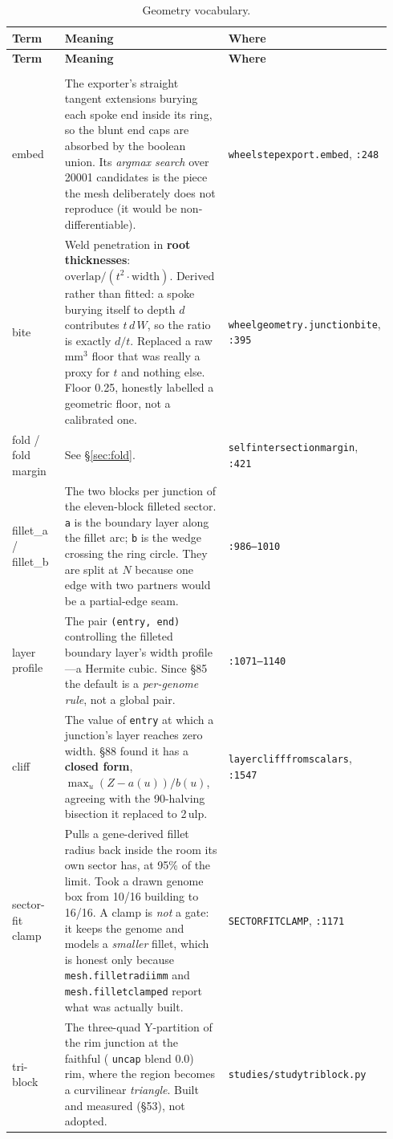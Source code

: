 \documentclass[11pt,a4paper]{article}
\makeatletter
\DeclareRobustCommand{\code}[1]{%
  \texttt{\small\def\_{\textunderscore\discretionary{}{}{}}#1}}
\newenvironment{termtable}[1]
  {\small\begin{longtable}{@{}>{\raggedright\arraybackslash}p{0.19\linewidth}
                             >{\raggedright\arraybackslash}p{0.54\linewidth}
                             >{\raggedright\arraybackslash}p{0.21\linewidth}@{}}
   \caption{#1}\\
   \toprule
   \textbf{Term} & \textbf{Meaning} & \textbf{Where} \\
   \midrule
   \endfirsthead
   \toprule
   \textbf{Term} & \textbf{Meaning} & \textbf{Where} \\
   \midrule
   \endhead
   \midrule
   \multicolumn{3}{r@{}}{\emph{continued on the next page}}\\
   \endfoot
   \bottomrule
   \endlastfoot}
  {\end{longtable}}
\makeatother
\begin{document}
\begin{termtable}{Geometry vocabulary.}
\addlinespace
embed &
  The exporter's straight tangent extensions burying each spoke end inside its ring, so
  the blunt end caps are absorbed by the boolean union. Its \emph{argmax search} over
  20001 candidates is the piece the mesh deliberately does not reproduce (it would be
  non-differentiable). &
  \code{wheel\_step\_export.\_embed}, \code{:248} \\
\addlinespace
bite &
  Weld penetration in \textbf{root thicknesses}:
  $\mathrm{overlap}/(t^2 \cdot \mathrm{width})$. Derived rather than fitted: a spoke
  burying itself to depth $d$ contributes $t\,d\,W$, so the ratio is exactly $d/t$.
  Replaced a raw mm$^3$ floor that was really a proxy for $t$ and nothing else. Floor
  0.25, honestly labelled a geometric floor, not a calibrated one. &
  \code{wheel\_geometry.junction\_bite}, \code{:395} \\
\addlinespace
fold / fold margin &
  See \S\ref{sec:fold}. &
  \code{self\_intersection\_margin}, \code{:421} \\
\addlinespace
fillet\_a / fillet\_b &
  The two blocks per junction of the eleven-block filleted sector. \code{a} is the
  boundary layer along the fillet arc; \code{b} is the wedge crossing the ring circle.
  They are split at $N$ because one edge with two partners would be a partial-edge
  seam. &
  \code{:986--1010} \\
\addlinespace
layer profile &
  The pair \code{(entry, end)} controlling the filleted boundary layer's width
  profile---a Hermite cubic. Since \S85 the default is a \emph{per-genome rule}, not a
  global pair. &
  \code{:1071--1140} \\
\addlinespace
cliff &
  The value of \code{entry} at which a junction's layer reaches zero width. \S88 found
  it has a \textbf{closed form}, $\max_u (Z - a(u))/b(u)$, agreeing with the 90-halving
  bisection it replaced to 2\,ulp. &
  \code{\_layer\_cliff\_from\_scalars}, \code{:1547} \\
\addlinespace
sector-fit clamp &
  Pulls a gene-derived fillet radius back inside the room its own sector has, at 95\% of
  the limit. Took a drawn genome box from 10/16 building to 16/16. A clamp is \emph{not}
  a gate: it keeps the genome and models a \emph{smaller} fillet, which is honest only
  because \code{mesh.fillet\_radii\_mm} and \code{mesh.fillet\_clamped} report what was
  actually built. &
  \code{SECTOR\_FIT\_CLAMP}, \code{:1171} \\
\addlinespace
tri-block &
  The three-quad Y-partition of the rim junction at the faithful (\code{uncap} blend
  0.0) rim, where the region becomes a curvilinear \emph{triangle}. Built and measured
  (\S53), not adopted. &
  \code{studies/study\_tri\_block.py} \\
\end{termtable}
\end{document}
